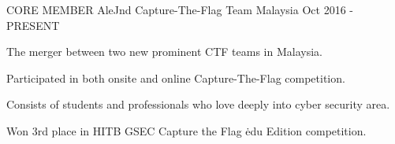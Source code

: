 

\begin{cventries}

    \cventry
    {CORE MEMBER}
    {AleJnd Capture-The-Flag Team}
    {Malaysia}
    {Oct 2016 - PRESENT}
    {
      \begin{cvitems}
        \item {The merger between two new prominent CTF teams in Malaysia.}
        \item {Participated in both onsite and online Capture-The-Flag competition.}
        \item {Consists of students and professionals who love deeply into cyber security area.}
        \item {Won 3rd place in HITB GSEC Capture the Flag \.edu Edition competition.}
      \end{cvitems}
    }
\end{cventries}
